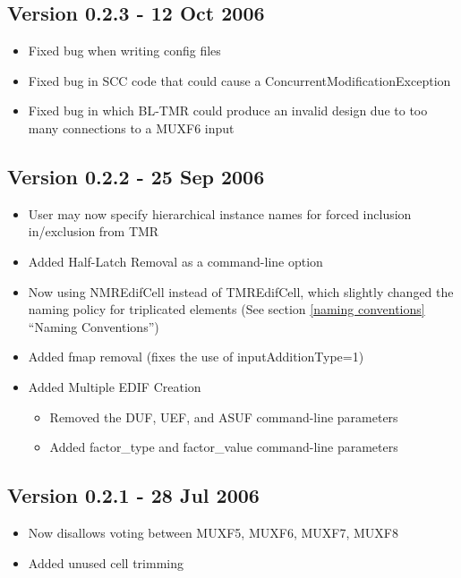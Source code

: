 \documentclass[english]{article}
\numberwithin{figure}{section}
\begin{document}
\subsection*{Version 0.2.3 - 12 Oct 2006}
\begin{itemize}
\item Fixed bug when writing config files
\item Fixed bug in SCC code that could cause a ConcurrentModificationException
\item Fixed bug in which BL-TMR could produce an invalid design due to too many
  connections to a MUXF6 input
\end{itemize}

\subsection*{Version 0.2.2 - 25 Sep 2006}
\begin{itemize}
  \item User may now specify hierarchical instance names for forced inclusion
  in/exclusion from TMR
  \item Added Half-Latch Removal as a command-line option
  \item Now using NMREdifCell instead of TMREdifCell, which slightly changed the
  naming policy for triplicated elements (See section \ref{naming conventions}
  ``Naming Conventions'')
  \item Added fmap removal (fixes the use of inputAdditionType=1)
  \item Added Multiple EDIF Creation
  \begin{itemize}
    \item Removed the DUF, UEF, and ASUF command-line parameters
    \item Added factor\_type and factor\_value command-line parameters
  \end{itemize}
\end{itemize}

\subsection*{Version 0.2.1 - 28 Jul 2006}
\begin{itemize}
\item Now disallows voting between MUXF5, MUXF6, MUXF7, MUXF8
\item Added unused cell trimming
\end{itemize}
\end{document}
